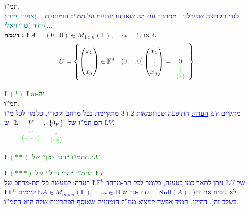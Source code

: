 \documentclass[english,hebrew]{article}
\begin{document}
תמ\textquotedblright ו.\\

\textcolor{blue}{לגבי הקבוצה שקיבלנו - מסתדר עם מה שאנחנו יודעים על
ממ\textquotedblright ל הומוגניות...} \textcolor{teal}{)אפיון פתרון
יחיד )טריוויאלי(...(}\\

\textbf{דוגמה }\textbf{{}\endL}\textbf{:} \textbf{\quad{}}\L{$A=(0\dots0)\in M_{1\times n}(\mathbb{F}),\quad m=1$}.
אז \L{%
\[
U=\left\{ \begin{pmatrix}x_{1}\\
\vdots\\
x_{n}
\end{pmatrix}\in\mathbb{F}^{n}\;\middle|\;(0\dots0)\begin{pmatrix}x_{1}\\
\vdots\\
x_{n}
\end{pmatrix}=\underset{\begin{array}{c}
\textcolor{green}{\downarrow}\\
\textcolor{green}{(*)}
\end{array}}{0}\right\} 
\]
}%

\textcolor{green}{\L{$(*)$} \L{$m$}-יה}\\

תמ\textquotedblright ו.\\

\textcolor{blue}{\uline{הערה:}}\textcolor{blue}{{} התופעה שבדוגמאות
2 ו-3 מתקיימת בכל מרחב וקטורי, כלומר לכל מ\textquotedblright ו \L{$V$}
מתקיים ש-} \L{$\underset{\begin{array}{c}
\textcolor{green}{\downarrow}\\
\textcolor{green}{(***)}
\end{array}}{V},\underset{\begin{array}{c}
\textcolor{green}{\downarrow}\\
\textcolor{green}{(**)}
\end{array}}{\{0_{V}\}}$} \textcolor{blue}{הם תמ\textquotedblright ו של \L{$V$}.}

\textcolor{green}{\L{$(**)$} התמ\textquotedblright ו \textquotedblleft הכי
קטן\textquotedblright{} של \L{$V$}}

\textcolor{green}{\L{$(***)$} התמ\textquotedblright ו \textquotedblleft הכי
גדול\textquotedblright{} של \L{$V$}}\\

\textcolor{blue}{\uline{הערה:}}\textcolor{blue}{{} למעשה כל תת-מרחב
של \L{$\mathbb{F}^{n}$} ניתן לתאר כמו בטענה, כלומר לכל תת-מרחב \L{$U$}
של \L{$\mathbb{F}^{n}$} קיימים}\textbf{\textcolor{blue}{\quad{}}}\textcolor{blue}{{}
\L{$A\in M_{m\times n}(\mathbb{F}),\quad m\in\mathbb{N}$} כך ש- \L{$U=\text{Null}(A)$}.
)לא נוכיח את זה בשלב זה(. דהיינו, תמיד אפשר למצוא ממ\textquotedblright ל
הומוגנית שאוסף הפתרונות שלה הוא התמ\textquotedblright ו.}
\end{document}
